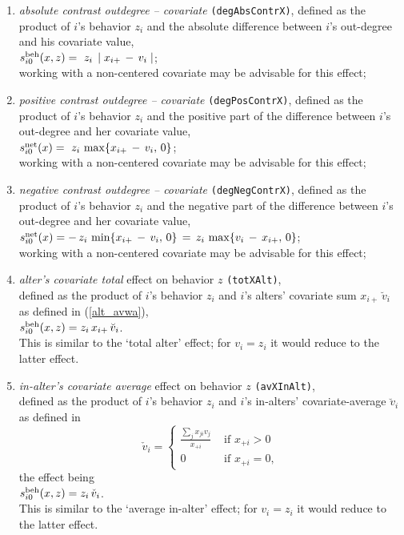 \documentclass[a4paper,fleqn,11pt]{article}
\newcommand{\+}{\, + \,}
\newcommand{\vit}{\theenumi}
\begin{document}
\begin{enumerate}
\item {\em absolute contrast outdegree -- covariate}
 \texttt{(degAbsContrX)},
 defined as the product of $i$'s behavior $z_i$ and
 the absolute difference between $i$'s out-degree and his covariate value,\\
 $s^{\rm beh}_{i\vit}(x, z) = \ z_i \, \mid x_{i+} \,-\, v_i  \mid $;\\
 working with a non-centered covariate may be advisable for this effect;

\item {\em positive contrast outdegree -- covariate}
 \texttt{(degPosContrX)},
 defined as the product of $i$'s behavior $z_i$ and
 the positive part of the difference between $i$'s out-degree
 and her covariate value,\\
 $s^{\rm net}_{i\vit}(x) = \ z_i \, \max \{ x_{i+} \,-\,  v_i   ,\, 0 \} $;\\
 working with a non-centered covariate may be advisable for this effect;

\item {\em negative contrast outdegree -- covariate}
 \texttt{(degNegContrX)},
 defined as the product of $i$'s behavior $z_i$ and
 the negative part of the difference between $i$'s out-degree
 and her covariate value,\\
 $s^{\rm net}_{i\vit}(x) =  - \, z_i \, \min \{ x_{i+} \,-\, v_i   ,\, 0 \}
 \,=\, z_i \, \max \{  v_i  \,-\, x_{i+} ,\, 0 \}  $;\\
 working with a non-centered covariate may be advisable for this effect;


\item \emph{alter's covariate total } effect on behavior $z$
 \texttt{(totXAlt)},\\
      defined as the product of $i$'s behavior $z_i$ and
      $i$'s alters' covariate sum $x_{i+}\,\breve v_i$ as defined
      in (\ref{alt_avwa}),\\
       $s^{\rm beh}_{i\vit}(x, z) = z_i \, x_{i+}\, \breve v_i $.\\
      This is similar to the `total alter' effect; for
      $v_i = z_i$ it would reduce to the latter effect.

\item \emph{in-alter's covariate average } effect on behavior $z$
 \texttt{(avXInAlt)},\\
      defined as the product of $i$'s behavior $z_i$ and
      $i$'s in-alters' covariate-average $\breve v_i$ as defined
      in
\begin{equation}
  \check v_i = \left\{\begin{array}{ll} \displaystyle
         \frac{\sum_j x_{ji}v_j}{x_{+i}}  &  \text{ if } x_{+i} > 0     \\
         0                                &  \text{ if } x_{+i} = 0  ,
  \end{array}   \right.            \label{inalt_av}
\end{equation}
      the effect being \\
       $s^{\rm beh}_{i\vit}(x, z) = z_i \, \check v_i $.\\
      This is similar to the `average in-alter' effect; for
      $v_i = z_i$ it would reduce to the latter effect.


\end{enumerate}
\end{document}
